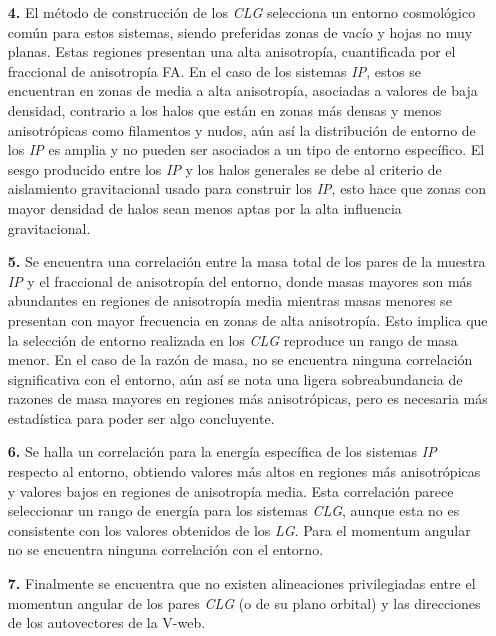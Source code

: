 \begin{enumerate}
\item[\textbf{4.}] El método de construcción de los 
\textit{CLG} selecciona un entorno cosmológico común para estos 
sistemas, siendo preferidas zonas de vacío y hojas no muy planas.
Estas regiones presentan una alta anisotropía, cuantificada por el 
fraccional de anisotropía FA. En el caso de los sistemas \textit{IP},
estos se encuentran en zonas de media a alta anisotropía, asociadas 
a valores de baja densidad, contrario a los halos que están en zonas 
más densas y menos anisotrópicas como filamentos y nudos, aún así 
la distribución de entorno de los \textit{IP} es amplia y no pueden
ser asociados a un tipo de entorno específico. El sesgo producido
entre los \textit{IP} y los halos generales se debe al criterio
de aislamiento gravitacional usado para construir los \textit{IP},
esto hace que zonas con mayor densidad de halos sean menos aptas por
la alta influencia gravitacional.


\item[\textbf{5.}] Se encuentra una correlación entre la masa total de 
los pares de la muestra \textit{IP} y el fraccional de anisotropía del 
entorno, donde masas mayores son más abundantes en regiones de 
anisotropía media mientras masas menores se presentan con mayor 
frecuencia en zonas de alta anisotropía. Esto implica que la selección
de entorno realizada en los \textit{CLG} reproduce un rango de masa menor.
En el caso de la razón de masa, no se encuentra ninguna correlación 
significativa con el entorno, aún así se nota una ligera sobreabundancia 
de razones de masa mayores en regiones más anisotrópicas, pero es 
necesaria más estadística para poder ser algo concluyente.


\item[\textbf{6.}] Se halla un correlación para la energía específica
de los sistemas \textit{IP} respecto al entorno, obtiendo valores más
altos en regiones más anisotrópicas y valores bajos en regiones de 
anisotropía media. Esta correlación parece seleccionar un rango de 
energía para los sistemas \textit{CLG}, aunque esta no es consistente
con los valores obtenidos de los \textit{LG}. Para el momentum angular
no se encuentra ninguna correlación con el entorno.


\item[\textbf{7.}] Finalmente se encuentra que no existen alineaciones
privilegiadas entre el momentun angular de los pares \textit{CLG} (o de 
su plano orbital) y las direcciones de los autovectores de la V-web.


\end{enumerate}


